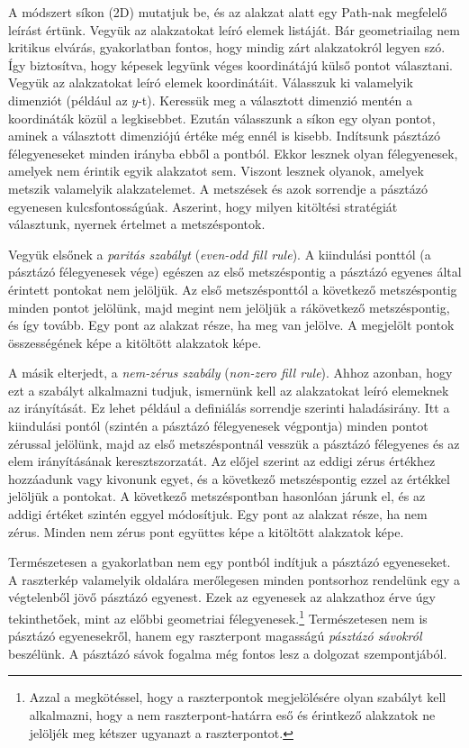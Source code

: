 \documentclass[12pt]{report}
\theoremstyle{definition}
\newcommand{\inenglish}[1]{\textsl{#1}}
\begin{document}
A módszert síkon (2D) mutatjuk be, és az alakzat alatt egy Path-nak megfelelő
leírást értünk. Vegyük az alakzatokat leíró elemek listáját. Bár geometriailag
nem kritikus elvárás, gyakorlatban fontos, hogy mindig zárt alakzatokról legyen
szó. Így biztosítva, hogy képesek legyünk véges koordinátájú külső pontot
választani. Vegyük az alakzatokat leíró elemek koordinátáit. Válasszuk ki
valamelyik dimenziót (például az $y$-t). Keressük meg a választott dimenzió
mentén a koordináták közül a legkisebbet. Ezután válasszunk a síkon egy olyan
pontot, aminek a választott dimenziójú értéke még ennél is kisebb. Indítsunk
pásztázó félegyeneseket minden irányba ebből a pontból. Ekkor lesznek olyan
félegyenesek, amelyek nem érintik egyik alakzatot sem. Viszont lesznek olyanok,
amelyek metszik valamelyik alakzatelemet. A metszések és azok sorrendje a
pásztázó egyenesen kulcsfontosságúak. Aszerint, hogy milyen kitöltési
stratégiát választunk, nyernek értelmet a metszéspontok.

Vegyük elsőnek a \emph{paritás szabályt} (\inenglish{even-odd fill rule}). A
kiindulási ponttól (a pásztázó félegyenesek vége) egészen az első metszéspontig
a pásztázó egyenes által érintett pontokat nem jelöljük. Az első metszésponttól
a következő metszéspontig minden pontot jelölünk, majd megint nem jelöljük a
rákövetkező metszéspontig, és így tovább. Egy pont az alakzat része, ha meg van
jelölve. A megjelölt pontok összességének képe a kitöltött alakzatok képe.

A másik elterjedt, a \emph{nem-zérus szabály} (\inenglish{non-zero fill rule}).
Ahhoz azonban, hogy ezt a szabályt alkalmazni tudjuk, ismernünk kell az
alakzatokat leíró elemeknek az irányítását. Ez lehet például a definiálás
sorrendje szerinti haladásirány. Itt a kiindulási pontól (szintén a pásztázó
félegyenesek végpontja) minden pontot zérussal jelölünk, majd az első
metszéspontnál vesszük a pásztázó félegyenes és az elem irányításának
keresztszorzatát. Az előjel szerint az eddigi zérus értékhez hozzáadunk vagy
kivonunk egyet, és a következő metszéspontig ezzel az értékkel jelöljük a
pontokat. A következő metszéspontban hasonlóan járunk el, és az addigi értéket
szintén eggyel módosítjuk. Egy pont az alakzat része, ha nem zérus. Minden nem
zérus pont együttes képe a kitöltött alakzatok képe.

Természetesen a gyakorlatban nem egy pontból indítjuk a pásztázó egyeneseket. A
raszterkép valamelyik oldalára merőlegesen minden pontsorhoz rendelünk egy a
végtelenből jövő pásztázó egyenest. Ezek az egyenesek az alakzathoz érve úgy
tekinthetőek, mint az előbbi geometriai félegyenesek.\footnote{Azzal a
megkötéssel, hogy a raszterpontok megjelölésére olyan szabályt kell alkalmazni,
hogy a nem raszterpont-határra eső és érintkező alakzatok ne jelöljék meg
kétszer ugyanazt a raszterpontot.} Természetesen nem is pásztázó egyenesekről,
hanem egy raszterpont magasságú \emph{pásztázó sávokról} beszélünk. A pásztázó
sávok fogalma még fontos lesz a dolgozat szempontjából.
\end{document}
